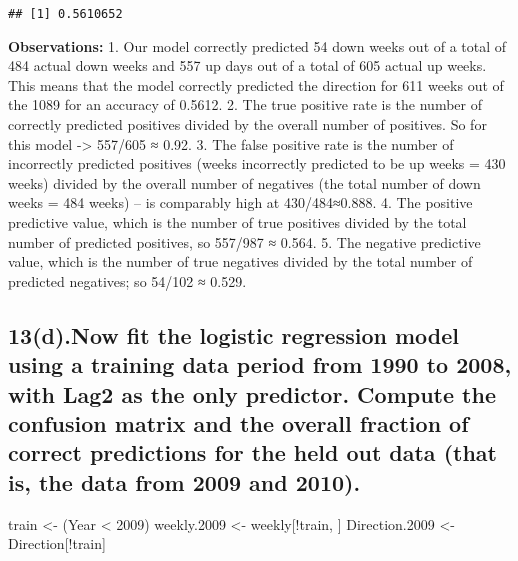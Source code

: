 \documentclass[
]{article}
\newenvironment{Shaded}{\begin{snugshade}}{\end{snugshade}}
\newcommand{\DecValTok}[1]{\textcolor[rgb]{0.00,0.00,0.81}{#1}}
\newcommand{\FloatTok}[1]{\textcolor[rgb]{0.00,0.00,0.81}{#1}}
\newcommand{\NormalTok}[1]{#1}
\newcommand{\OtherTok}[1]{\textcolor[rgb]{0.56,0.35,0.01}{#1}}
\newcommand{\SpecialCharTok}[1]{\textcolor[rgb]{0.00,0.00,0.00}{#1}}
\begin{document}
\begin{verbatim}
## [1] 0.5610652
\end{verbatim}

\textbf{Observations:} 1. Our model correctly predicted 54 down weeks
out of a total of 484 actual down weeks and 557 up days out of a total
of 605 actual up weeks. This means that the model correctly predicted
the direction for 611 weeks out of the 1089 for an accuracy of 0.5612.
2. The true positive rate is the number of correctly predicted positives
divided by the overall number of positives. So for this model
-\textgreater{} 557/605 ≈ 0.92. 3. The false positive rate is the number
of incorrectly predicted positives (weeks incorrectly predicted to be up
weeks = 430 weeks) divided by the overall number of negatives (the total
number of down weeks = 484 weeks) -- is comparably high at
430/484≈0.888. 4. The positive predictive value, which is the number of
true positives divided by the total number of predicted positives, so
557/987 ≈ 0.564. 5. The negative predictive value, which is the number
of true negatives divided by the total number of predicted negatives; so
54/102 ≈ 0.529.

\hypertarget{d.now-fit-the-logistic-regression-model-using-a-training-data-period-from-1990-to-2008-with-lag2-as-the-only-predictor.-compute-the-confusion-matrix-and-the-overall-fraction-of-correct-predictions-for-the-held-out-data-that-is-the-data-from-2009-and-2010.}{%
\subsection{13(d).Now fit the logistic regression model using a training
data period from 1990 to 2008, with Lag2 as the only predictor. Compute
the confusion matrix and the overall fraction of correct predictions for
the held out data (that is, the data from 2009 and
2010).}\label{d.now-fit-the-logistic-regression-model-using-a-training-data-period-from-1990-to-2008-with-lag2-as-the-only-predictor.-compute-the-confusion-matrix-and-the-overall-fraction-of-correct-predictions-for-the-held-out-data-that-is-the-data-from-2009-and-2010.}}

\begin{Shaded}
\begin{Highlighting}[]
\NormalTok{train }\OtherTok{\textless{}{-}}\NormalTok{ (Year }\SpecialCharTok{\textless{}} \DecValTok{2009}\NormalTok{)}
\NormalTok{weekly}\FloatTok{.2009} \OtherTok{\textless{}{-}}\NormalTok{ weekly[}\SpecialCharTok{!}\NormalTok{train, ]}
\NormalTok{Direction}\FloatTok{.2009} \OtherTok{\textless{}{-}}\NormalTok{ Direction[}\SpecialCharTok{!}\NormalTok{train]}
\end{Highlighting}
\end{Shaded}
\end{document}
